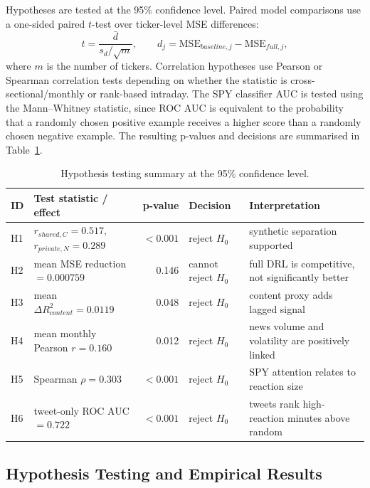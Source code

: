 \documentclass[12pt, a4paper]{article}
\begin{document}
Hypotheses are tested at the 95\% confidence level. Paired model comparisons use a one-sided paired $t$-test over ticker-level MSE differences:
\[
    t=\frac{\bar d}{s_d/\sqrt{m}}, \qquad d_j=\text{MSE}_{baseline,j}-\text{MSE}_{full,j},
\]
where $m$ is the number of tickers. Correlation hypotheses use Pearson or Spearman correlation tests depending on whether the statistic is cross-sectional/monthly or rank-based intraday. The SPY classifier AUC is tested using the Mann--Whitney statistic, since ROC AUC is equivalent to the probability that a randomly chosen positive example receives a higher score than a randomly chosen negative example. The resulting p-values and decisions are summarised in Table~\ref{tab:hypothesis_tests}.

\begin{table}[htbp]
\centering
\caption{Hypothesis testing summary at the 95\% confidence level.}
\label{tab:hypothesis_tests}
\small
\setlength{\tabcolsep}{4pt}
\begin{tabular}{lp{4.2cm}rp{2.7cm}p{3.0cm}}
\toprule
\textbf{ID} & \textbf{Test statistic / effect} & \textbf{p-value} & \textbf{Decision} & \textbf{Interpretation} \\
\midrule
H1 & $r_{shared,C}=0.517$, $r_{private,N}=0.289$ & $<0.001$ & reject $H_0$ & synthetic separation supported \\
H2 & mean MSE reduction $=0.000759$ & 0.146 & cannot reject $H_0$ & full DRL is competitive, not significantly better \\
H3 & mean $\Delta R^2_{content}=0.0119$ & 0.048 & reject $H_0$ & content proxy adds lagged signal \\
H4 & mean monthly Pearson $r=0.160$ & 0.012 & reject $H_0$ & news volume and volatility are positively linked \\
H5 & Spearman $\rho=0.303$ & $<0.001$ & reject $H_0$ & SPY attention relates to reaction size \\
H6 & tweet-only ROC AUC $=0.722$ & $<0.001$ & reject $H_0$ & tweets rank high-reaction minutes above random \\
\bottomrule
\end{tabular}
\end{table}


\subsection{Hypothesis Testing and Empirical Results}
\label{sec:hypothesis_results}
\end{document}
